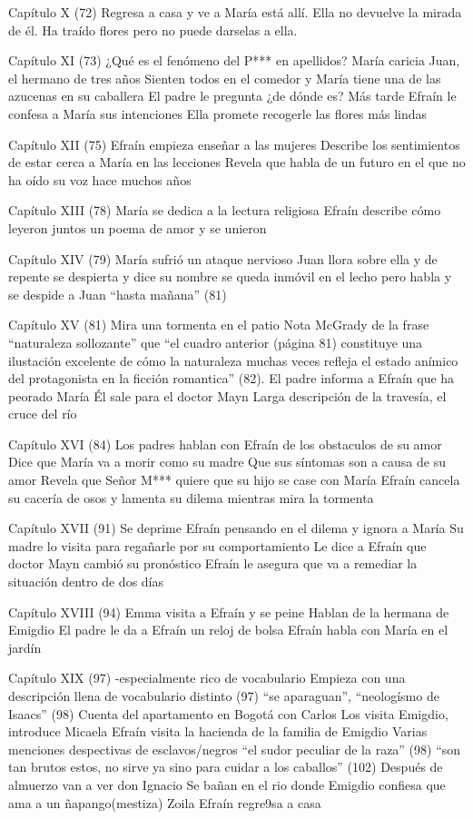 Capítulo X (72)
Regresa a casa y ve a María está allí. 
Ella no devuelve la mirada de él.
Ha traído flores pero no puede darselas a ella.



Capítulo XI (73)
¿Qué es el fenómeno del P*** en apellidos?
María caricia Juan, el hermano de tres años
Sienten todos en el comedor y María tiene una de las azucenas en su caballera
El padre le pregunta ¿de dónde es?
Más tarde Efraín le confesa a María sus intenciones
Ella promete recogerle las flores más lindas

Capítulo XII (75)
Efraín empieza enseñar a las mujeres 
Describe los sentimientos de estar cerca a María en las lecciones
Revela que habla de un futuro en el que no ha oído su voz hace muchos años

Capítulo XIII (78)
María se dedica a la lectura religiosa
Efraín describe cómo leyeron juntos un poema de amor y se unieron

Capítulo XIV (79)
María sufrió un ataque nervioso
Juan llora sobre ella y de repente se despierta y dice su nombre
se queda inmóvil en el lecho pero habla y se despide a Juan “hasta mañana” (81)

Capítulo XV (81)
Mira una tormenta en el patio
Nota McGrady de la frase “naturaleza sollozante” que “el cuadro anterior (página 81) constituye una ilustación excelente de cómo la naturaleza muchas veces refleja el estado anímico del protagonista en la ficción romantica” (82).
El padre informa a Efraín que ha peorado María
Él sale para el doctor Mayn
Larga descripción de la travesía, el cruce del río

Capítulo XVI (84)
Los padres hablan con Efraín de los obstaculos de su amor
Dice que María va a morir como su madre
Que sus síntomas son a causa de su amor
Revela que Señor M*** quiere que su hijo se case con María
Efraín cancela su cacería de osos y lamenta su dilema mientras mira la tormenta

Capítulo XVII (91)
Se deprime Efraín pensando en el dilema y ignora a María
Su madre lo visita para regañarle por su comportamiento 
Le dice a Efraín que doctor Mayn cambió su pronóstico
Efraín le asegura que va a remediar la situación dentro de dos días

Capítulo XVIII (94)
Emma visita a Efraín y se peine 
Hablan de la hermana de Emigdio
El padre le da a Efraín un reloj de bolsa
Efraín habla con María en el jardín

Capítulo XIX (97) -especialmente rico de vocabulario
Empieza con una descripción llena de vocabulario distinto (97)
“se aparaguan”, “neologísmo de Isaacs” (98)
Cuenta del apartamento en Bogotá con Carlos
	Los visita Emigdio, introduce Micaela
Efraín visita la hacienda de la familia de Emigdio
Varias menciones despectivas de esclavos/negros
“el sudor peculiar de la raza” (98)
“son tan brutos estos, no sirve ya sino para cuidar a los caballos” (102)
Después de almuerzo van a ver don Ignacio
Se bañan en el rio donde Emigdio confiesa que ama a un ñapango(mestiza) Zoila
Efraín regre9sa a casa 

